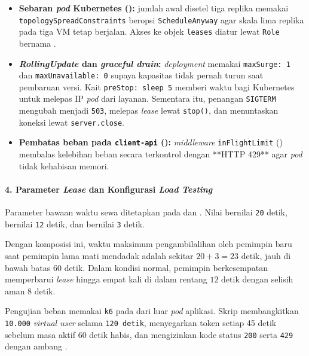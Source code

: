 \begin{itemize}
  \item \textbf{Sebaran \textit{pod} Kubernetes ():} jumlah awal disetel tiga replika memakai \texttt{topologySpreadConstraints} beropsi \texttt{ScheduleAnyway} agar skala lima replika pada tiga VM tetap berjalan. Akses ke objek \texttt{leases} diatur lewat \texttt{Role} bernama .
  \item \textbf{\textit{RollingUpdate} dan \textit{graceful drain}:} \textit{deployment} memakai \texttt{maxSurge: 1} dan \texttt{maxUnavailable: 0} supaya kapasitas tidak pernah turun saat pembaruan versi. Kait \texttt{preStop: sleep 5} memberi waktu bagi Kubernetes untuk melepas IP \textit{pod} dari layanan. Sementara itu, penangan \texttt{SIGTERM} mengubah  menjadi \texttt{503}, melepas \textit{lease} lewat \texttt{stop()}, dan menuntaskan koneksi lewat \texttt{server.close}.
  \item \textbf{Pembatas beban pada \texttt{client-api} ():} \textit{middleware} \texttt{inFlightLimit} () membalas kelebihan beban secara terkontrol dengan **HTTP 429** agar \textit{pod} tidak kehabisan memori.
\end{itemize}

\paragraph*{4. Parameter \textit{Lease} dan Konfigurasi \textit{Load Testing}}
Parameter bawaan waktu sewa ditetapkan pada  dan . Nilai  bernilai \texttt{20} detik,  bernilai \texttt{12} detik, dan  bernilai \texttt{3} detik.

Dengan komposisi ini, waktu maksimum pengambilalihan oleh pemimpin baru saat pemimpin lama mati mendadak adalah sekitar $20 + 3 = 23\text{ detik}$, jauh di bawah batas $60\text{ detik}$. Dalam kondisi normal, pemimpin berkesempatan memperbarui \textit{lease} hingga empat kali di dalam rentang $12\text{ detik}$ dengan selisih aman $8\text{ detik}$.

Pengujian beban memakai \texttt{k6} pada  dari luar \textit{pod} aplikasi. Skrip membangkitkan \texttt{10.000} \textit{virtual user} selama \texttt{120 detik}, menyegarkan token setiap 45 detik sebelum masa aktif 60 detik habis, dan mengizinkan kode status \texttt{200} serta \texttt{429} dengan ambang .

